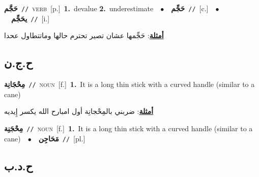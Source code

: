 \documentclass[10pt,a4paper,twoside]{article} %
\begin{document}
\begin{multicols}{2}
{\setlength\topsep{0pt}\textbf{\foreignlanguage{arabic}{حَجَّم}}\ {\color{gray}\texttt{//}\color{black}}\ \textsc{verb}\ [p.]\ \textbf{1.}~devalue  \textbf{2.}~underestimate\ \ $\bullet$\ \ \setlength\topsep{0pt}\textbf{\foreignlanguage{arabic}{حَجِّم}}\ {\color{gray}\texttt{//}\color{black}}\ [c.]\ \ $\bullet$\ \ \setlength\topsep{0pt}\textbf{\foreignlanguage{arabic}{يحَجِّم}}\ {\color{gray}\texttt{//}\color{black}}\ [i.]\  \begin{flushright}\color{gray}\foreignlanguage{arabic}{\textbf{\underline{\foreignlanguage{arabic}{أمثلة}}}: حَجِّمها عشان تصير تحترم حالها وماتتطاول عحدا}\end{flushright}\color{black}} \vspace{2mm}

\vspace{-3mm}
\subsection*{\color{blue}\foreignlanguage{arabic}{ح.ج.ن}\color{blue}{}} 

{\setlength\topsep{0pt}\textbf{\foreignlanguage{arabic}{مِحْجَانِة}}\ {\color{gray}\texttt{//}\color{black}}\ \textsc{noun}\ [f.]\ \textbf{1.}~It is a long thin stick with a curved handle (similar to a cane)\  \begin{flushright}\color{gray}\foreignlanguage{arabic}{\textbf{\underline{\foreignlanguage{arabic}{أمثلة}}}: ضربني بالمِحْجانِة أول امبارح الله يكسر إِيديه}\end{flushright}\color{black}} \vspace{2mm}

{\setlength\topsep{0pt}\textbf{\foreignlanguage{arabic}{مِحْجَنِة}}\ {\color{gray}\texttt{//}\color{black}}\ \textsc{noun}\ [f.]\ \textbf{1.}~It is a long thin stick with a curved handle (similar to a cane)\ \ $\bullet$\ \ \setlength\topsep{0pt}\textbf{\foreignlanguage{arabic}{مَحَاجِن}}\ {\color{gray}\texttt{//}\color{black}}\ [pl.]\ } \vspace{2mm}

\vspace{-3mm}
\subsection*{\color{blue}\foreignlanguage{arabic}{ح.د.ب}\color{blue}{}} 


\end{multicols}
\end{document}
